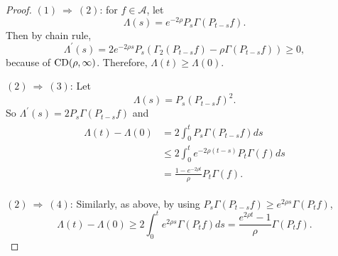 \begin{proof}
    $(1)~\Rightarrow~(2)$: for $f \in \mathcal{A}$, let
    \begin{equation*}
    	\Lambda(s) = e^{-2\rho}P_s\Gamma(P_{t-s}f).
    \end{equation*}
    Then by chain rule,
    \begin{equation*}
    	\Lambda^{\prime}(s)=2 e^{-2 \rho s} P_s\left(\Gamma_2\left(P_{t-s} f\right)-\rho \Gamma\left(P_{t-s} f\right)\right) \geq 0,
    \end{equation*}
    because of $\operatorname{CD}(\rho,\infty)$. Therefore, $\Lambda(t) \geq \Lambda(0)$.

    $(2)~\Rightarrow~(3)$: Let
    \begin{equation*}
    	\Lambda(s)=P_s\left(P_{t-s} f\right)^2.
    \end{equation*}
    So $\Lambda^{\prime}(s)=2 P_s \Gamma\left(P_{t-s} f\right)$ and
    \begin{align*}
    	\begin{aligned}
			\Lambda(t)-\Lambda(0) & =2 \int_0^t P_s \Gamma\left(P_{t-s} f\right) d s \\
			& \leq 2 \int_0^t e^{-2 \rho(t-s)} P_t \Gamma(f) d s \\
			& =\frac{1-e^{-2 \rho t}}{\rho} P_t \Gamma(f).
		\end{aligned}
    \end{align*}

    $(2)~\Rightarrow~(4)$: Similarly, as above, by using $P_s \Gamma\left(P_{t-s} f\right) \geq e^{2 \rho s} \Gamma\left(P_t f\right)$,
    \begin{equation*}
    	\Lambda(t)-\Lambda(0) \geq 2 \int_0^t e^{2 \rho s} \Gamma\left(P_t f\right) d s=\frac{e^{2 \rho t}-1}{\rho} \Gamma\left(P_t f\right).
    \end{equation*}


\end{proof}
